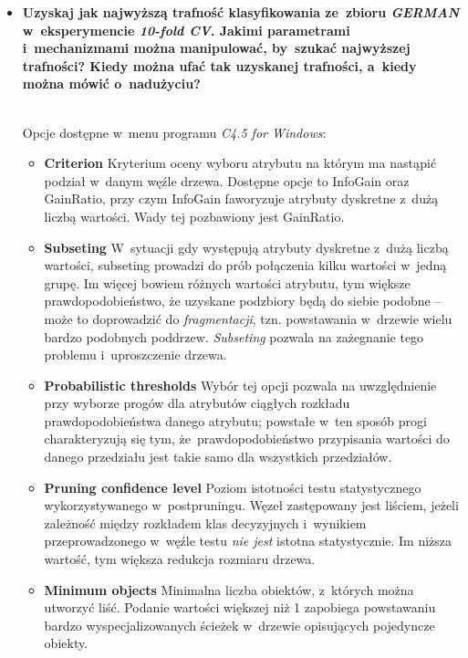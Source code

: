 \begin{itemize}
\item \textbf{Uzyskaj jak najwyższą trafność klasyfikowania ze~zbioru \emph{GERMAN} w~eksperymencie \emph{10-fold CV}. Jakimi parametrami i~mechanizmami można manipulować, by~szukać najwyższej trafności? Kiedy można ufać tak uzyskanej trafności, a~kiedy można mówić o~nadużyciu?}

\\Opcje dostępne w~menu programu \emph{C4.5 for Windows}:
\begin{itemize}
\item \textbf{Criterion} 
Kryterium oceny wyboru atrybutu na którym ma nastąpić podział w~danym węźle drzewa. Dostępne opcje to InfoGain oraz GainRatio, przy czym InfoGain faworyzuje atrybuty dyskretne z~dużą liczbą wartości. Wady tej pozbawiony jest GainRatio.

\item \textbf{Subseting} 
W~sytuacji gdy występują atrybuty dyskretne z~dużą liczbą wartości, subseting prowadzi do prób połączenia kilku wartości w~jedną grupę. Im więcej bowiem różnych wartości atrybutu, tym większe prawdopodobieństwo, że uzyskane podzbiory będą do siebie podobne -- może to doprowadzić do \emph{fragmentacji}, tzn. powstawania w~drzewie wielu bardzo podobnych poddrzew. \emph{Subseting} pozwala na zażegnanie tego problemu i~uproszczenie drzewa.

\item \textbf{Probabilistic thresholds}
Wybór tej opcji pozwala na uwzględnienie przy wyborze progów dla atrybutów ciągłych rozkładu prawdopodobieństwa danego atrybutu; powstałe w~ten sposób progi charakteryzują się tym, że~prawdopodobieństwo przypisania wartości do danego przedziału jest takie samo dla wszystkich przedziałów.

\item \textbf{Pruning confidence level} 
Poziom istotności testu statystycznego wykorzystywanego w~postpruningu. Węzeł zastępowany jest liściem, jeżeli zależność między rozkładem klas decyzyjnych i~wynikiem przeprowadzonego w~węźle testu \emph{nie jest} istotna statystycznie. Im niższa wartość, tym większa redukcja rozmiaru drzewa.

\item \textbf{Minimum objects}
Minimalna liczba obiektów, z~których można utworzyć liść. Podanie wartości większej niż 1 zapobiega powstawaniu bardzo wyspecjalizowanych ścieżek w~drzewie opisujących pojedyncze obiekty.
\end{itemize}



\end{itemize}
